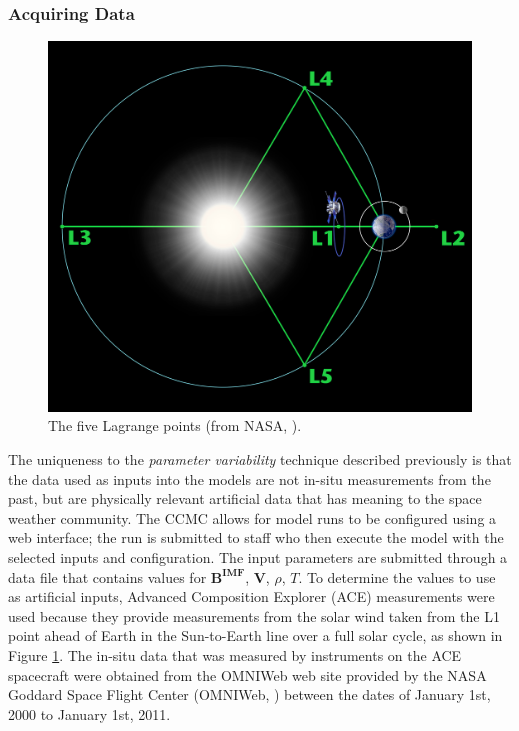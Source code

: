 \subsubsection{Acquiring Data}
\begin{figure}
	\centering
	\includegraphics[scale=0.1]{images/LagrangePoints.jpg}
	\caption{The five Lagrange points (from NASA, \citeyear{Lagrange}).}
    \label{fig:LagrangePoints}
	\figSpace
\end{figure}
The uniqueness to the \textit{parameter variability} technique described previously is
that the data used as inputs into the models are not in-situ measurements from
the past, but are physically relevant artificial data that has meaning to the
space weather community. The CCMC allows for model runs to be configured using a
web interface; the run is submitted to staff who then execute the
model with the selected inputs and configuration. The input parameters are
submitted through a data file that contains values for $\mathbf{B^{IMF}}$,
$\mathbf{V}$, $\rho$, $T$. To determine the values to use as artificial inputs,
Advanced Composition Explorer (ACE) measurements were used because they
provide measurements from the solar wind taken from the L1 point ahead of Earth
in the Sun-to-Earth line over a full solar cycle, as shown in Figure
\ref{fig:LagrangePoints}. The in-situ data that was measured by instruments on
the ACE spacecraft were obtained from the OMNIWeb web site provided by the NASA
Goddard Space Flight Center (OMNIWeb, \citeyear{OMNIWeb}) between the dates of
January 1st, 2000 to January 1st, 2011.

